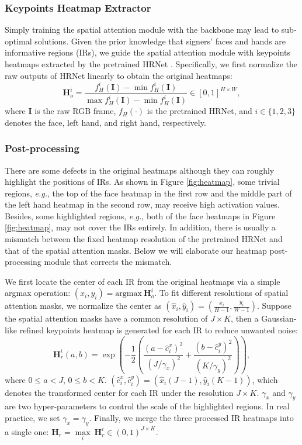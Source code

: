 \documentclass[acmsmall,screen]{acmart}
\def\eg{\emph{e.g.}} \def\Eg{\emph{E.g.}}
\def \mbf{\mathbf}
\begin{document}
\subsubsection{Keypoints Heatmap Extractor}
Simply training the spatial attention module with the backbone may lead to sub-optimal solutions.
Given the prior knowledge that signers' faces and hands are informative regions (IRs), we guide the spatial attention module with keypoints heatmaps extracted by the pretrained HRNet \cite{sun2019deep, andriluka20142d}.
Specifically, we first normalize the raw outputs of HRNet linearly to obtain the original heatmaps:
\begin{equation}
    \mbf{H}_o^i = \frac{f_H^i(\mbf{I}) - \min {f_H^i(\mbf{I})}} {\max {f_H^i(\mbf{I})} - \min{f_H^i(\mbf{I})}} \in [0,1]^{H\times W},
\end{equation}
where $\mbf{I}$ is the raw RGB frame, $f_H(\cdot)$ is the pretrained HRNet, and $i\in\{1,2,3\}$ denotes the face, left hand, and right hand, respectively.


\subsubsection{Post-processing}
\label{sec:post-process}
There are some defects in the original heatmaps although they can roughly highlight the positions of IRs.
As shown in Figure \ref{fig:heatmap}, some trivial regions, \eg, the top of the face heatmap in the first row and the middle part of the left hand heatmap in the second row, may receive high activation values.
Besides, some highlighted regions, \eg, both of the face heatmaps in Figure \ref{fig:heatmap}, may not cover the IRs entirely.
In addition, there is usually a mismatch between the fixed heatmap resolution of the pretrained HRNet and that of the spatial attention masks.
Below we will elaborate our heatmap post-processing module that corrects the mismatch.

We first locate the center of each IR from the original heatmaps via a simple argmax operation: $(x_i, y_i) =\mathrm{argmax}\ \mbf{H}_o^i$.
To fit different resolutions of spatial attention masks, we normalize the center as $(\hat{x}_i, \hat{y}_i) = (\frac{x_i}{H-1}, \frac{y_i}{W-1})$.
Suppose the spatial attention masks have a common resolution of $J \times K$, then a Gaussian-like refined keypoints heatmap is generated for each IR to reduce unwanted noise:
\begin{equation}
\label{equ:post}
    \mbf{H}_r^i(a,b) = \exp{\left(-\frac{1}{2}\left(\frac{(a-\hat{c}_i^x)^2}{(J/\gamma_x)^2}+\frac{(b-\hat{c}_i^y)^2}{(K/\gamma_y)^2}\right)\right)},
\end{equation}
where $0\leq a < J$, $0\leq b < K$. 
$(\hat{c}_i^x, \hat{c}_i^y) = (\hat{x}_i(J-1), \hat{y}_i(K-1))$, which denotes the transformed center for each IR under the resolution $J \times K$.
$\gamma_x$ and $\gamma_y$ are two hyper-parameters to control the scale of the highlighted regions.
In real practice, we set $\gamma_x=\gamma_y$.
Finally, we merge the three processed IR heatmaps into a single one: $\mbf{H}_r = \underset{i}{\max}\ \mbf{H}_r^i \in (0,1)^{J\times K}$.
\end{document}

